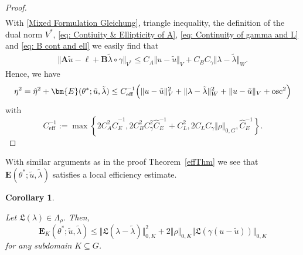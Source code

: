 \documentclass[12pt,twoside,reqno]{amsart}
\newtheorem{corollary}{Corollary}[section]
\theoremstyle{definition}
\numberwithin{equation}{section}
\renewcommand{\L}{\mathfrak{L}}
\newcommand{\A} {\bm{A}}
\newcommand{\lin} {\bm{\ell}}
\newcommand{\B} {\bm{B}}
\newcommand{\E} {\bm{E}}
\newcommand{\norm}[1]    {\Vert #1 \Vert}
\begin{document}
\begin{proof}
\begin{multline*}
        \end{multline*}
        With \eqref{Mixed Formulation Gleichung}, triangle inequality, the definition of the dual norm $V^*$, \eqref{eq: Contiuity & Ellipticity of A}, \eqref{eq: Continuity of gamma and L} and \eqref{eq: B cont and ell} we easily find that
        \begin{align*}
        \norm{\A \tilde{u}-\lin+\B\tilde{\lambda}\circ\gamma}_{V^*} \leq C_A \norm{u-\tilde{u}}_V + C_BC_\gamma \norm{\lambda - \tilde{\lambda}}_W.
        \end{align*}
        Hence, we have
        \begin{align*}
        \eta^2 = \hat{\eta}^2+\bm{E}(\theta^*;\tilde{u},\tilde{\lambda})\leq C_{\text{eff}}^{-1}\Bigl( \norm{u-\tilde{u}}_V^2 + \norm{{\lambda}-\tilde{\lambda}}_{W}^2 + \norm{u-\tilde{u}}_V+ \operatorname{osc}^2 \Bigr)
        \end{align*}
         with        
            \begin{equation*}\label{localE}
                 C_{\text{eff}}^{-1}:= \max\left\{{2C_A^2\widehat{C}_E^{-1}}{},{2C_B^2C^2_{\gamma}\widehat{C}_E^{-1}}{}+C_L^2,2C_LC_\gamma\norm{\rho}_{0,G},{\widehat{C}_E^{-1}}{}\right\}.
             \end{equation*}
        \end{proof}

With similar arguments as in the proof Theorem~\ref{effThm} we see that $\E(\theta^*;\tilde{u},\tilde{\lambda})$ satisfies a local efficiency estimate.

\begin{corollary} \label{cor:localEffiE}  

  Let $\L(\lambda)\in \Lambda_\rho$. Then, 
        \begin{equation*}
            \bm{E}_K(\theta^*; \tilde{u},\tilde{\lambda})
            \leq \norm{\L(\lambda-\tilde{\lambda})}_{0,K}^2 +2 \norm{\rho}_{0,K}\norm{\L(\gamma(u-\tilde{u}))}_{0,K}
        \end{equation*}
        for any subdomain $K\subseteq G$.
\end{corollary}
\end{document}
